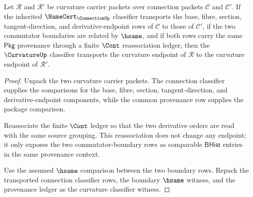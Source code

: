 \begin{theorem}
\label{thm:curvature-classifier-transport-row}
Let $\mathcal{R}$ and $\mathcal{R}'$ be curvature carrier packets over connection packets $\mathcal{C}$ and $\mathcal{C}'$. If the inherited $\NameCert_{\ConnectionUp}$ classifier transports the base, fibre, section, tangent-direction, and derivative-endpoint rows of $\mathcal{C}$ to those of $\mathcal{C}'$, if the two commutator boundaries are related by $\hsame$, and if both rows carry the same $\mathsf{Pkg}$ provenance through a finite $\Cont$ reassociation ledger, then the $\CurvatureUp$ classifier transports the curvature endpoint of $\mathcal{R}$ to the curvature endpoint of $\mathcal{R}'$.
\end{theorem}
\begin{proof}
Unpack the two curvature carrier packets. The connection classifier supplies the comparisons for the base, fibre, section, tangent-direction, and derivative-endpoint components, while the common provenance row supplies the package comparison.

Reassociate the finite $\Cont$ ledger so that the two derivative orders are read with the same source grouping. This reassociation does not change any endpoint; it only exposes the two commutator-boundary rows as comparable $\mathsf{BHist}$ entries in the same provenance context.

Use the assumed $\hsame$ comparison between the two boundary rows. Repack the transported connection classifier rows, the boundary $\hsame$ witness, and the provenance ledger as the curvature classifier witness.
\end{proof}

